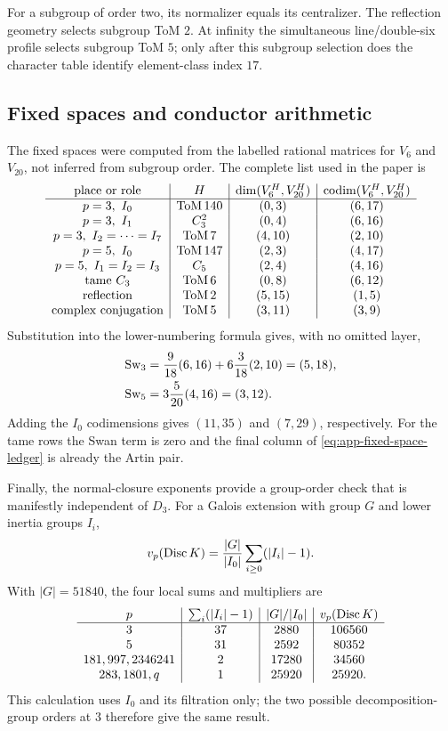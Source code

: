 For a subgroup of order two, its normalizer equals its centralizer.  The
reflection geometry selects subgroup ToM $2$.  At infinity the simultaneous
line/double-six profile selects subgroup ToM $5$; only after this subgroup
selection does the character table identify element-class index $17$.

\subsection{Fixed spaces and conductor arithmetic}

The fixed spaces were computed from the labelled rational matrices for
$V_6$ and $V_{20}$, not inferred from subgroup order.  The complete list used
in the paper is
\begin{equation}
\begin{array}{c|c|c|c}
\text{place or role}&H&\dim(V_6^H,V_{20}^H)&
\operatorname{codim}(V_6^H,V_{20}^H)\\ \hline
p=3,\ I_0&\mathrm{ToM}\,140&(0,3)&(6,17)\\
p=3,\ I_1&C_3^2&(0,4)&(6,16)\\
p=3,\ I_2=\cdots=I_7&\mathrm{ToM}\,7&(4,10)&(2,10)\\
p=5,\ I_0&\mathrm{ToM}\,147&(2,3)&(4,17)\\
p=5,\ I_1=I_2=I_3&C_5&(2,4)&(4,16)\\
\text{tame }C_3&\mathrm{ToM}\,6&(0,8)&(6,12)\\
\text{reflection}&\mathrm{ToM}\,2&(5,15)&(1,5)\\
\text{complex conjugation}&\mathrm{ToM}\,5&(3,11)&(3,9)
\end{array}
\label{eq:app-fixed-space-ledger}
\end{equation}
Substitution into the lower-numbering formula gives, with no omitted layer,
\[
\begin{aligned}
 \operatorname{Sw}_3&=\frac9{18}(6,16)+6\frac3{18}(2,10)=(5,18),\\
 \operatorname{Sw}_5&=3\frac5{20}(4,16)=(3,12).
\end{aligned}
\]
Adding the $I_0$ codimensions gives $(11,35)$ and $(7,29)$, respectively.
For the tame rows the Swan term is zero and the final column of
\cref{eq:app-fixed-space-ledger} is already the Artin pair.

Finally, the normal-closure exponents provide a group-order check that is
manifestly independent of $D_3$.  For a Galois extension with group $G$ and
lower inertia groups $I_i$,
\begin{equation}
 v_p(\operatorname{Disc} K)=\frac{|G|}{|I_0|}\sum_{i\geq0}(|I_i|-1).
 \label{eq:galois-disc-local}
\end{equation}
With $|G|=51840$, the four local sums and multipliers are
\[
\begin{array}{c|c|c|c}
p&\sum_i(|I_i|-1)&|G|/|I_0|&v_p(\operatorname{Disc} K)\\ \hline
3&37&2880&106560\\
5&31&2592&80352\\
181,997,2346241&2&17280&34560\\
283,1801,q&1&25920&25920.
\end{array}
\]
This calculation uses $I_0$ and its filtration only; the two possible
decomposition-group orders at $3$ therefore give the same result.
